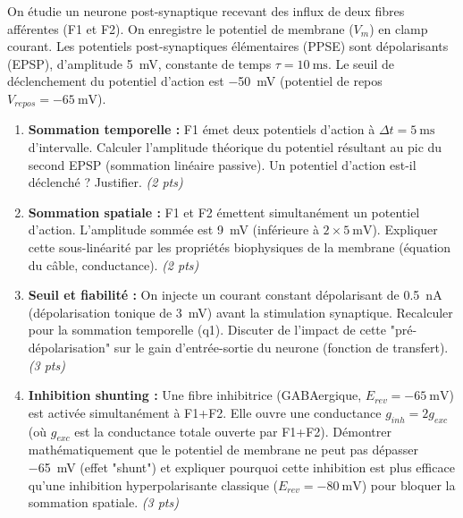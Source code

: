 \documentclass[11pt]{article}
\begin{document}
\begin{exercice}
On étudie un neurone post-synaptique recevant des influx de deux fibres afférentes (F1 et F2). On enregistre le potentiel de membrane ($V_m$) en clamp courant. Les potentiels post-synaptiques élémentaires (PPSE) sont dépolarisants (EPSP), d'amplitude \SI{5}{\milli\volt}, constante de temps $\tau = \SI{10}{\milli\second}$. Le seuil de déclenchement du potentiel d'action est \SI{-50}{\milli\volt} (potentiel de repos $V_{repos} = \SI{-65}{\milli\volt}$).
\begin{enumerate}
\item \textbf{Sommation temporelle :} F1 émet deux potentiels d'action à $\Delta t = \SI{5}{\milli\second}$ d'intervalle. Calculer l'amplitude théorique du potentiel résultant au pic du second EPSP (sommation linéaire passive). Un potentiel d'action est-il déclenché ? Justifier. \textit{(2 pts)}
\item \textbf{Sommation spatiale :} F1 et F2 émettent simultanément un potentiel d'action. L'amplitude sommée est \SI{9}{\milli\volt} (inférieure à $2 \times \SI{5}{\milli\volt}$). Expliquer cette sous-linéarité par les propriétés biophysiques de la membrane (équation du câble, conductance). \textit{(2 pts)}
\item \textbf{Seuil et fiabilité :} On injecte un courant constant dépolarisant de \SI{0,5}{\nano\ampere} (dépolarisation tonique de \SI{3}{\milli\volt}) avant la stimulation synaptique. Recalculer pour la sommation temporelle (q1). Discuter de l'impact de cette "pré-dépolarisation" sur le gain d'entrée-sortie du neurone (fonction de transfert). \textit{(3 pts)}
\item \textbf{Inhibition shunting :} Une fibre inhibitrice (GABAergique, $E_{rev} = \SI{-65}{\milli\volt}$) est activée simultanément à F1+F2. Elle ouvre une conductance $g_{inh} = 2 g_{exc}$ (où $g_{exc}$ est la conductance totale ouverte par F1+F2). Démontrer mathématiquement que le potentiel de membrane ne peut pas dépasser \SI{-65}{\milli\volt} (effet "shunt") et expliquer pourquoi cette inhibition est plus efficace qu'une inhibition hyperpolarisante classique ($E_{rev} = \SI{-80}{\milli\volt}$) pour bloquer la sommation spatiale. \textit{(3 pts)}
\end{enumerate}
\end{exercice}
\end{document}
